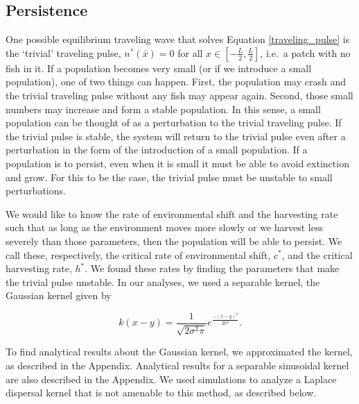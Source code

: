 \documentclass[12pt,english]{article}
\begin{document}
\subsection{Persistence }
One possible equilibrium traveling wave that solves Equation \ref{traveling_pulse} is the `trivial' traveling pulse, $n^*(\bar{x}) = 0$ for all $x \in \left[-\frac{L}
{2}, \frac{L}{2}\right]$, i.e.~a patch with no fish in it.  If a population becomes very small (or if we introduce a small 
population), one of two things can happen. First, the population may crash and the trivial traveling pulse 
without any fish may appear again. Second, those small numbers may increase and form a stable population. 
In this sense, a small population can be thought of as a perturbation to the trivial traveling pulse. If the trivial 
pulse is stable, the system will return to the trivial pulse even after a perturbation in the form of the introduction 
of a small population. If a population is to persist, even when it is small it must be able to avoid extinction and 
grow. For this to be the case, the trivial pulse must be unstable to small perturbations.  

We would like to know the rate of environmental shift and the harvesting rate such that as long as the 
environment moves more slowly or we harvest less severely than those parameters, then the population will be able to persist. We call these, respectively, the critical rate of environmental shift, $c^*$, and the critical harvesting rate, $h^*$. 
We found these rates by finding the parameters that make the trivial pulse unstable.   In our analyses, we used a  separable kernel, the Gaussian kernel given by

\[k(x-y)=\frac{1}{\sqrt{2\sigma^2\pi}}e^{\frac{-(x-y)^2}{2\sigma^2}}.\]

\noindent To find analytical results about the Gaussian kernel, we approximated the kernel, as described in the Appendix.  Analytical results for a separable sinusoidal kernel are also described in the Appendix.  We used 
simulations to analyze a Laplace dispersal kernel that is not amenable to this method, as described below.
\end{document}
